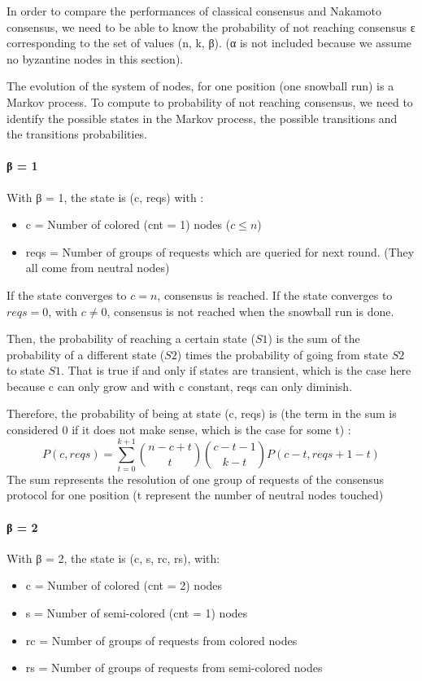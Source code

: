 \documentclass[11pt, twocolumn]{article}
\begin{document}
In order to compare the performances of classical consensus and Nakamoto consensus, we need to be able to know the probability of not reaching consensus ε corresponding to the set
of values (n, k, β). (α is not included because we assume no byzantine nodes in this section).

The evolution of the system of nodes, for one position (one snowball run) is a Markov process. To compute to probability of not reaching consensus, we need to identify the possible states in the
Markov process, the possible transitions and the transitions probabilities.

\paragraph{β = 1}
With β = 1, the state is (c, reqs) with :
\begin{itemize}
    \item c = Number of colored (cnt = 1) nodes ($c \leq n$)
    \item reqs = Number of groups of requests which are queried for next round. (They all come from neutral nodes)
\end{itemize}
If the state converges to $c = n$, consensus is reached.
If the state converges to $reqs = 0$, with $c \neq 0$, consensus is not reached when the snowball run is done.

Then, the probability of reaching a certain state ($S1$) is the sum of the probability of a different state ($S2$) times the probability of going from state $S2$ to state $S1$.
That is true if and only if states are transient, which is the case here because c can only grow and with c constant, reqs can only diminish.

Therefore, the probability of being at state (c, reqs) is (the term in the sum is considered 0 if it does not make sense, which is the case for some t) :
\begin{equation*}
    P(c, reqs) = \sum_{t=0}^{k+1} {n-c+t \choose t}{c-t-1 \choose k-t}P(c-t, reqs+1-t)
\end{equation*}
The sum represents the resolution of one group of requests of the consensus protocol for one position (t represent the number of neutral nodes touched)


\paragraph{β = 2}
With β = 2, the state is (c, s, rc, rs), with:
\begin{itemize}
    \item c = Number of colored (cnt = 2) nodes
    \item s = Number of semi-colored (cnt = 1) nodes
    \item rc = Number of groups of requests from colored nodes
    \item rs = Number of groups of requests from semi-colored nodes
\end{itemize}
\end{document}
